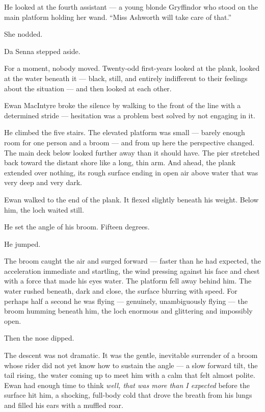 He looked at the fourth assistant --- a young blonde Gryffindor who stood on the main platform holding her wand. \enquote{Miss Ashworth will take care of that.}
 
She nodded.
 
Da Senna stepped aside.
 
For a moment, nobody moved. Twenty-odd first-years looked at the plank, looked at the water beneath it --- black, still, and entirely indifferent to their feelings about the situation --- and then looked at each other.
 
Ewan MacIntyre broke the silence by walking to the front of the line with a determined stride --- hesitation was a problem best solved by not engaging in it.
 
He climbed the five stairs. The elevated platform was small --- barely enough room for one person and a broom --- and from up here the perspective changed. The main deck below looked further away than it should have. The pier stretched back toward the distant shore like a long, thin arm. And ahead, the plank extended over nothing, its rough surface ending in open air above water that was very deep and very dark.
 
Ewan walked to the end of the plank. It flexed slightly beneath his weight. Below him, the loch waited still.
 
He set the angle of his broom. Fifteen degrees.
 
He jumped.
 
The broom caught the air and surged forward --- faster than he had expected, the acceleration immediate and startling, the wind pressing against his face and chest with a force that made his eyes water. The platform fell away behind him. The water rushed beneath, dark and close, the surface blurring with speed. For perhaps half a second he was flying --- genuinely, unambiguously flying --- the broom humming beneath him, the loch enormous and glittering and impossibly open.
 
Then the nose dipped.
 
The descent was not dramatic. It was the gentle, inevitable surrender of a broom whose rider did not yet know how to sustain the angle --- a slow forward tilt, the tail rising, the water coming up to meet him with a calm that felt almost polite. Ewan had enough time to think \textit{well, that was more than I expected} before the surface hit him, a shocking, full-body cold that drove the breath from his lungs and filled his ears with a muffled roar.
 
